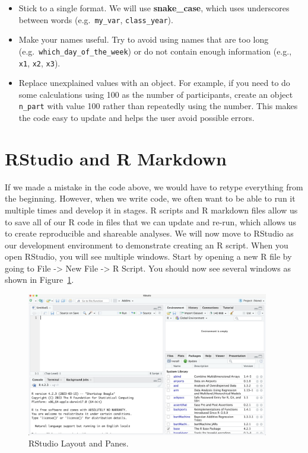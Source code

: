 \documentclass[
  letterpaper,
]{krantz}
\providecommand{\tightlist}{%
  \setlength{\itemsep}{0pt}\setlength{\parskip}{0pt}}\usepackage{longtable,booktabs,array}
\begin{document}
\begin{itemize}
\tightlist
\item
  Stick to a single format. We will use \textbf{snake\_case}, which uses
  underscores between words (e.g.~\texttt{my\_var},
  \texttt{class\_year}).\\
\item
  Make your names useful. Try to avoid using names that are too long\\
  (e.g.~\texttt{which\_day\_of\_the\_week}) or do not contain enough
  information (e.g., \texttt{x1}, \texttt{x2}, \texttt{x3}).\\
\item
  Replace unexplained values with an object. For example, if you need to
  do some calculations using 100 as the number of participants, create
  an object \texttt{n\_part} with value 100 rather than repeatedly using
  the number. This makes the code easy to update and helps the user
  avoid possible errors.
\end{itemize}

\hypertarget{rstudio-and-r-markdown}{%
\section{RStudio and R Markdown}\label{rstudio-and-r-markdown}}

If we made a mistake in the code above, we would have to retype
everything from the beginning. However, when we write code, we often
want to be able to run it multiple times and develop it in stages. R
scripts and R markdown files allow us to save all of our R code in files
that we can update and re-run, which allows us to create reproducible
and shareable analyses. We will now move to RStudio as our development
environment to demonstrate creating an R script. When you open RStudio,
you will see multiple windows. Start by opening a new R file by going to
File -\textgreater{} New File -\textgreater{} R Script. You should now
see several windows as shown in Figure~\ref{fig-rstudio}.

\begin{figure}

{\centering \includegraphics[width=4.16667in,height=\textheight]{book/images/1-rstudio.png}

}

\caption{\label{fig-rstudio}RStudio Layout and Panes.}

\end{figure}
\end{document}
